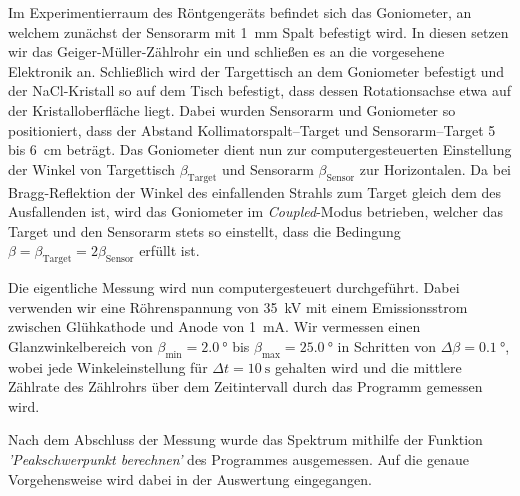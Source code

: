 \documentclass[11pt, a4paper]{article}
\begin{document}
Im Experimentierraum des Röntgengeräts befindet sich das Goniometer, an welchem zunächst der Sensorarm mit \SI{1}{\milli\metre} Spalt befestigt wird.
In diesen setzen wir das Geiger-Müller-Zählrohr ein und schließen es an die vorgesehene Elektronik an.
Schließlich wird der Targettisch an dem Goniometer befestigt und der NaCl-Kristall so auf dem Tisch befestigt, dass dessen Rotationsachse etwa auf der Kristalloberfläche liegt.
Dabei wurden Sensorarm und Goniometer so positioniert, dass der Abstand Kollimatorspalt--Target und Sensorarm--Target \num{5} bis \SI{6}{\centi\metre} beträgt.
Das Goniometer dient nun zur computergesteuerten Einstellung der Winkel von Targettisch $\beta_\mathrm{Target}$ und Sensorarm $\beta_\mathrm{Sensor}$ zur Horizontalen.
Da bei Bragg-Reflektion der Winkel des einfallenden Strahls zum Target gleich dem des Ausfallenden ist, wird das Goniometer im \emph{Coupled}-Modus betrieben, welcher das Target und den Sensorarm stets so einstellt, dass die Bedingung $\beta = \beta_\mathrm{Target} = 2\beta_\mathrm{Sensor}$ erfüllt ist.

Die eigentliche Messung wird nun computergesteuert durchgeführt.
Dabei verwenden wir eine Röhrenspannung von \SI{35}{\kilo\volt} mit einem Emissionsstrom zwischen Glühkathode und Anode von \SI{1}{\milli\ampere}.
Wir vermessen einen Glanzwinkelbereich von $\beta_\mathrm{min} = \SI{2,0}{\degree}$ bis $\beta_\mathrm{max} = \SI{25,0}{\degree}$ in Schritten von $\Delta \beta = \SI{0,1}{\degree}$, wobei jede Winkeleinstellung für $\Delta t = \SI{10}{\second}$ gehalten wird und die mittlere Zählrate des Zählrohrs über dem Zeitintervall durch das Programm gemessen wird.

Nach dem Abschluss der Messung wurde das Spektrum mithilfe der Funktion \emph{'Peakschwerpunkt berechnen'} des Programmes ausgemessen. Auf die genaue Vorgehensweise wird dabei in der Auswertung eingegangen.
\end{document}
